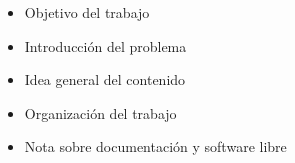 \begin{itemize}
\tightlist
\item
  Objetivo del trabajo
\item
  Introducción del problema
\item
  Idea general del contenido
\item
  Organización del trabajo
\item
  Nota sobre documentación y software libre
\end{itemize}

